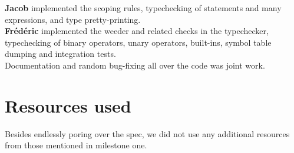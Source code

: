\documentclass[letterpaper,11pt]{article}
\begin{document}
\textbf{Jacob} implemented the scoping rules, typechecking of statements and many expressions, and type pretty-printing.
\\
\textbf{Fr\'ed\'eric} implemented the weeder and related checks in the typechecker, typechecking of binary operators, unary operators, built-ins, symbol table dumping and integration tests.
\\
Documentation and random bug-fixing all over the code was joint work.

\section{Resources used}
Besides endlessly poring over the spec, we did not use any additional resources from those mentioned in milestone one.
\end{document}
